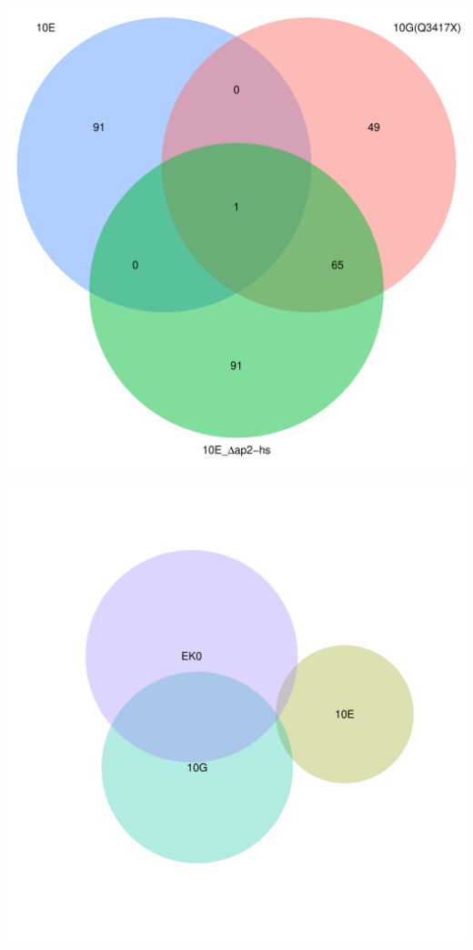 \documentclass{article}\usepackage[]{graphicx}\usepackage[]{color}
\newenvironment{knitrout}{}{} %
\begin{document}
\begin{knitrout}
\color{fgcolor}

{\centering \includegraphics[width=1\linewidth,height=.4\textheight]{figure/minimal-venn_t3_3fc_down_venn-1} 

}



\end{knitrout}
\begin{knitrout}
\color{fgcolor}

{\centering \includegraphics[width=1\linewidth,height=.4\textheight]{figure/minimal-venn_t3_3fc_down_euler-1} 

}



\end{knitrout}
\end{document}
